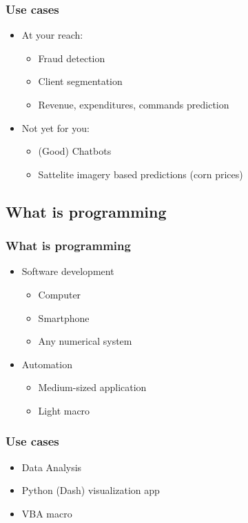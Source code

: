 \begin{frame}\frametitle{Use cases}
   \begin{itemize}
      \item At your reach:
      \begin{itemize}
         \item Fraud detection
         \item Client segmentation
         \item Revenue, expenditures, commands prediction
      \end{itemize}
      \item Not yet for you:
      \begin{itemize}
         \item (Good) Chatbots
         \item Sattelite imagery based predictions (corn prices)
      \end{itemize}
   \end{itemize}
\end{frame}



\subsection{What is programming}
\begin{frame}\frametitle{What is programming}
   \begin{itemize}
      \item Software development
      \begin{itemize}
         \item Computer
         \item Smartphone
         \item Any numerical system
      \end{itemize}
      \item Automation
      \begin{itemize}
         \item Medium-sized application
         \item Light macro
      \end{itemize}
   \end{itemize}
\end{frame}

\begin{frame}\frametitle{Use cases}
   \begin{itemize}
      \item Data Analysis
      \item Python (Dash) visualization app
      \item VBA macro
   \end{itemize}
\end{frame}



